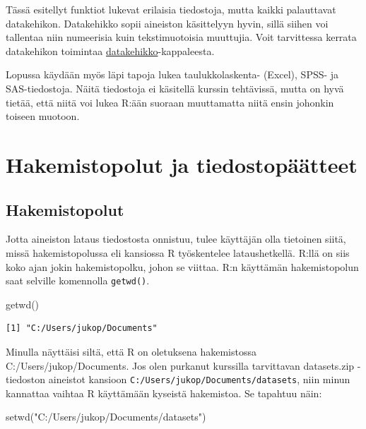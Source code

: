 \documentclass[
]{book}
\newenvironment{Shaded}{\begin{snugshade}}{\end{snugshade}}
\newcommand{\FunctionTok}[1]{\textcolor[rgb]{0.00,0.00,0.00}{#1}}
\newcommand{\NormalTok}[1]{#1}
\newcommand{\StringTok}[1]{\textcolor[rgb]{0.31,0.60,0.02}{#1}}
\begin{document}
Tässä esitellyt funktiot lukevat erilaisia tiedostoja, mutta kaikki palauttavat datakehikon. Datakehikko sopii aineiston käsittelyyn hyvin, sillä siihen voi tallentaa niin numeerisia kuin tekstimuotoisia muuttujia. Voit tarvittessa kerrata datakehikon toimintaa \protect\hyperlink{data-frame}{datakehikko}-kappaleesta.

Lopussa käydään myös läpi tapoja lukea taulukkolaskenta- (Excel), SPSS- ja SAS-tiedostoja. Näitä tiedostoja ei käsitellä kurssin tehtävissä, mutta on hyvä tietää, että niitä voi lukea R:ään suoraan muuttamatta niitä ensin johonkin toiseen muotoon.

\hypertarget{hakemistopolut-ja-tiedostopuxe4uxe4tteet}{%
\section{Hakemistopolut ja tiedostopäätteet}\label{hakemistopolut-ja-tiedostopuxe4uxe4tteet}}

\hypertarget{hakemistopolut}{%
\subsection{Hakemistopolut}\label{hakemistopolut}}

Jotta aineiston lataus tiedostosta onnistuu, tulee käyttäjän olla tietoinen siitä, missä hakemistopolussa eli kansiossa R työskentelee lataushetkellä. R:llä on siis koko ajan jokin hakemistopolku, johon se viittaa. R:n käyttämän hakemistopolun saat selville komennolla \texttt{getwd()}.

\begin{Shaded}
\begin{Highlighting}[]
\FunctionTok{getwd}\NormalTok{()}
\end{Highlighting}
\end{Shaded}

\begin{verbatim}
[1] "C:/Users/jukop/Documents"
\end{verbatim}

Minulla näyttäisi siltä, että R on oletuksena hakemistossa C:/Users/jukop/Documents. Jos olen purkanut kurssilla tarvittavan datasets.zip -tiedoston aineistot kansioon \texttt{C:/Users/jukop/Documents/datasets}, niin minun kannattaa vaihtaa R käyttämään kyseistä hakemistoa. Se tapahtuu näin:

\begin{Shaded}
\begin{Highlighting}[]
\FunctionTok{setwd}\NormalTok{(}\StringTok{"C:/Users/jukop/Documents/datasets"}\NormalTok{)}
\end{Highlighting}
\end{Shaded}
\end{document}
